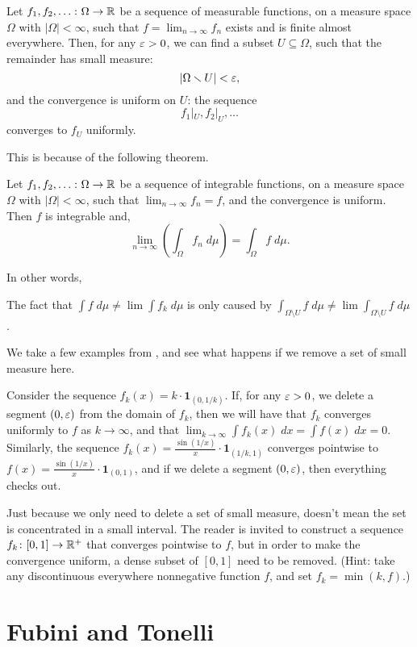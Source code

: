 \begin{theorem}
	Let $f_1, f_2, \dots \colon \Omega \to \mathbb R$
	be a sequence of measurable functions, on a measure space $\Omega$ with $|\Omega| < \infty$,
	such that $f = \lim_{n \to \infty} f_n$ exists and is finite almost everywhere.
	Then, for any $\varepsilon>0$,
	we can find a subset $U \subseteq \Omega$, such that
	the remainder has small measure:
	\[
		|\Omega \smallsetminus U| < \varepsilon,
	\]
	and the convergence is uniform on $U$: the sequence
	\[
		f_1|_U, f_2|_U, \dots
	\]
	converges to $f_U$ uniformly.
\end{theorem}

This is because of the following theorem.
\begin{theorem}
	Let $f_1, f_2, \dots \colon \Omega \to \mathbb R$
	be a sequence of integrable functions, on a measure space $\Omega$ with $|\Omega| < \infty$,
	such that $\lim_{n \to \infty} f_n = f$, and the convergence is uniform.
	Then $f$ is integrable and,
	\[ \lim_{n \to \infty} \left( \int_\Omega f_n \; d\mu \right)
		= \int_\Omega f \; d\mu. \]
\end{theorem}

In other words,
\begin{moral}
	The fact that $\int f \; d\mu \neq \lim \int f_k \; d\mu$ is only caused by
	$\int_{ \Omega \setminus U } f \; d\mu \neq \lim \int_{ \Omega \setminus U } f \; d\mu$.
\end{moral}

\begin{example}
	We take a few examples from , and see what happens if we remove
	a set of small measure here.
	\begin{itemize}
		\ii Consider the sequence $f_k(x) = k \cdot \mathbf{1}_{(0, 1/k)}$. If, for any $\varepsilon>0$,
		we delete a segment $(0, \varepsilon)$ from the domain of $f_k$, then we will have that $f_k$ converges
		uniformly to $f$ as $k \to \infty$, and that $\lim_{k \to \infty} \int f_k(x) \; dx = \int f(x)
		\; dx = 0$.
		\ii Similarly, the sequence $f_k(x) = \frac{\sin(1/x)}{x} \cdot \mathbf{1}_{(1/k, 1)}$
		converges pointwise to $f(x) = \frac{\sin(1/x)}{x} \cdot \mathbf{1}_{(0, 1)}$,
		and if we delete a segment $(0, \varepsilon)$, then everything checks out.
	\end{itemize}
\end{example}

\begin{remark}
	Just because we only need to delete a set of small measure, doesn't mean the set is concentrated in a
	small interval. The reader is invited to construct a sequence $f_k \colon [0, 1] \to \mathbb R^+$
	that converges pointwise to $f$, but in order to make the convergence uniform, a dense subset of $[0,
	1]$ need to be removed.
	(Hint: take any discontinuous everywhere nonnegative function $f$, and set $f_k = \min(k, f)$.)
\end{remark}

\section{Fubini and Tonelli}

\section{\problemhead}
